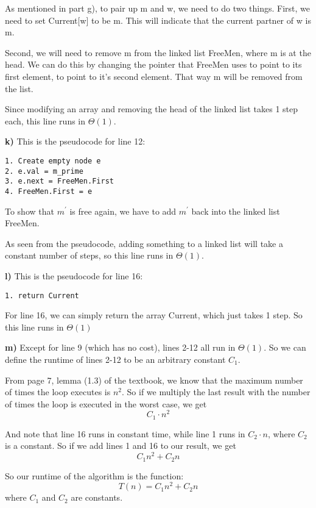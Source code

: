 \documentclass{article}
\begin{document}
As mentioned in part g), to pair up m and w, we need to do two things. First, we need to set Current[w] to be m. This will indicate that the current partner of w is m.
 
Second, we will need to remove m from the linked list FreeMen, where m is at the head. We can do this by changing the pointer that FreeMen uses to point to its first element, to point to it's second element. That way m will be removed from the list.

Since modifying an array and removing the head of the linked list takes 1 step each, this line runs in $\Theta(1)$.


\textbf{k)} This is the pseudocode for line 12:
\begin{lstlisting}
1. Create empty node e
2. e.val = m_prime
3. e.next = FreeMen.First   
4. FreeMen.First = e
\end{lstlisting}

To show that $m^\prime$ is free again, we have to add $m^\prime$ back into the linked list FreeMen.

As seen from the pseudocode, adding something to a linked list will take a constant number of steps, so this line runs in $\Theta(1)$.

\textbf{l)} This is the pseudocode for line 16:
\begin{lstlisting}
1. return Current
\end{lstlisting} 

For line 16, we can simply return the array Current, which just takes 1 step. So this line runs in $\Theta(1)$

\textbf{m)} Except for line 9 (which has no cost), lines 2-12 all run in $\Theta(1)$. So we can define the runtime of lines 2-12 to be an arbitrary constant $C_1$.

From page 7, lemma (1.3) of the textbook, we know that the maximum number of times the loop executes is $n^2$. So if we multiply the last result with the number of times the loop is executed in the worst case, we get 
\[C_1 \cdot n^2\]

And note that line 16 runs in constant time, while line 1 runs in $C_2 \cdot n$, where $C_2$ is a constant.
So if we add lines 1 and 16 to our result, we get 
\[C_1 n^2 + C_2 n\]

So our runtime of the algorithm is the function:
\[T(n) = C_1 n^2 + C_2 n\]
where $C_1$ and $C_2$ are constants.

\begin{lstlisting}

\end{lstlisting} 
\end{document}
